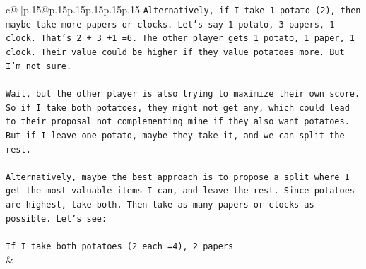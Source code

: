 \documentclass{article}
\begin{document}
{\begin{supertabular}{c@{$\;$}|p{.15\linewidth}@{}p{.15\linewidth}p{.15\linewidth}p{.15\linewidth}p{.15\linewidth}p{.15\linewidth}}
{{{\texttt{Alternatively, if I take 1 potato (2), then maybe take more papers or clocks. Let's say 1 potato, 3 papers, 1 clock. That's 2 + 3 +1 =6. The other player gets 1 potato, 1 paper, 1 clock. Their value could be higher if they value potatoes more. But I'm not sure.} \\
\\ 
\texttt{Wait, but the other player is also trying to maximize their own score. So if I take both potatoes, they might not get any, which could lead to their proposal not complementing mine if they also want potatoes. But if I leave one potato, maybe they take it, and we can split the rest.} \\
\\ 
\texttt{Alternatively, maybe the best approach is to propose a split where I get the most valuable items I can, and leave the rest. Since potatoes are highest, take both. Then take as many papers or clocks as possible. Let's see:} \\
\\ 
\texttt{If I take both potatoes (2 each =4), 2 papers} \\
            }
        }
    }
    & \\ \\


\end{supertabular}}
\end{document}
